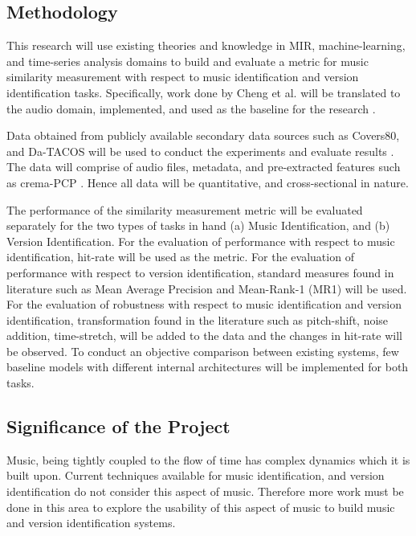\documentclass[../main.tex]{subfiles}
\begin{document}
\subsection{Methodology}
\par
This research will use existing theories and knowledge in \gls{MIR}, machine-learning, and time-series analysis domains to build and evaluate a metric for music similarity measurement with respect to music identification and version identification tasks. Specifically, work done by Cheng et al. will be translated to the audio domain, implemented, and used as the baseline for the research \cite{tian_cheng_comparing_2018}.

\par
Data obtained from publicly available secondary data sources such as Covers80, and Da-TACOS will be used to conduct the experiments and evaluate results \cite{Covers80CoverSong}\cite{yesilerDATACOSDATASETCOVER2019}. The data will comprise of audio files, metadata, and pre-extracted features such as crema-PCP \cite{mcfeeSTRUCTUREDTRAININGLARGEVOCABULARY}. Hence all data will be quantitative, and cross-sectional in nature.

\par
The performance of the similarity measurement metric will be evaluated separately for the two types of tasks in hand (a) Music Identification, and (b) Version Identification. For the evaluation of performance with respect to music identification, hit-rate will be used as the metric. For the evaluation of performance with respect to version identification, standard measures found in literature such as Mean Average Precision and Mean-Rank-1 (MR1) will be used. For the evaluation of robustness with respect to music identification and version identification, transformation found in the literature such as pitch-shift, noise addition, time-stretch, will be added to the data and the changes in hit-rate will be observed. To conduct an objective comparison between existing systems, few baseline models with different internal architectures will be implemented for both tasks. 



\iffalse
\subsection{Significance of the Project}
\par
Music, being tightly coupled to the flow of time has complex dynamics which it is built upon. Current techniques available for music identification, and version identification do not consider this aspect of music. Therefore more work must be done in this area to explore the usability of this aspect of music to build music and version identification systems. 
\end{document}

